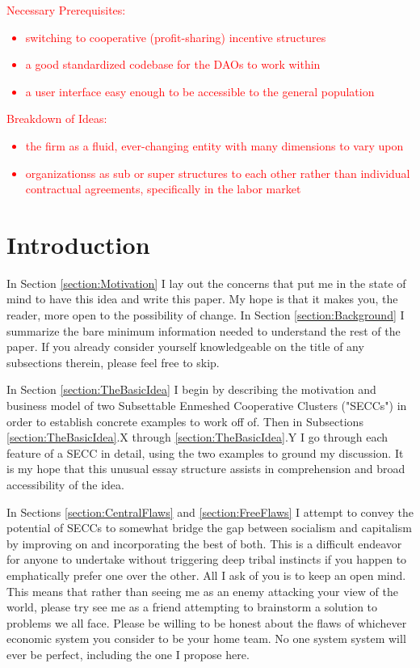 \documentclass{article}[10pt]
\begin{document}
\noindent \textcolor{red}{Necessary Prerequisites:}
\textcolor{red}{\begin{itemize}
    \item switching to cooperative (profit-sharing) incentive structures
    \item a good standardized codebase for the DAOs to work within
    \item a user interface easy enough to be accessible to the general population
\end{itemize}}
\textcolor{red}{Breakdown of Ideas:}
\textcolor{red}{\begin{itemize}
    \item the firm as a fluid, ever-changing entity with many dimensions to vary upon
    \item organizationss as sub or super structures to each other rather than individual contractual agreements, specifically in the labor market
\end{itemize}}

\section{Introduction}
\label{section:Introduction}
In Section \ref{section:Motivation} I lay out the concerns that put me in the state of mind to have this idea and write this paper.
My hope is that it makes you, the reader, more open to the possibility of change. 
In Section \ref{section:Background} I summarize the bare minimum information needed to understand the rest of the paper. 
If you already consider yourself knowledgeable on the title of any subsections therein, please feel free to skip. \par 

In Section \ref{section:TheBasicIdea} I begin by describing the motivation and business model of two Subsettable Enmeshed Cooperative Clusters ("SECCs") in order to establish concrete examples to work off of. 
Then in Subsections \ref{section:TheBasicIdea}.X through \ref{section:TheBasicIdea}.Y I go through each feature of a SECC in detail, using the two examples to ground my discussion.
It is my hope that this unusual essay structure assists in comprehension and broad accessibility of the idea. \par 

In Sections \ref{section:CentralFlaws} and \ref{section:FreeFlaws} I attempt to convey the potential of SECCs to somewhat bridge the gap between socialism and capitalism by improving on and incorporating the best of both. 
This is a difficult endeavor for anyone to undertake without triggering deep tribal instincts if you happen to emphatically prefer one over the other.
All I ask of you is to keep an open mind.
This means that rather than seeing me as an enemy attacking your view of the world, please try see me as a friend attempting to brainstorm a solution to problems we all face.
Please be willing to be honest about the flaws of whichever economic system you consider to be your home team.
No one system system will ever be perfect, including the one I propose here. \par 
\end{document}
